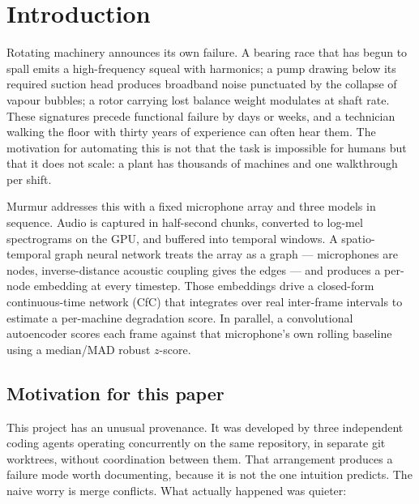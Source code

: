\documentclass[11pt]{article}
\let\oldsection\section
\renewcommand{\section}{\clearpage\oldsection}
\begin{document}
\clearpage
\tableofcontents

\section{Introduction}

Rotating machinery announces its own failure. A bearing race that has begun to
spall emits a high-frequency squeal with harmonics; a pump drawing below its
required suction head produces broadband noise punctuated by the collapse of
vapour bubbles; a rotor carrying lost balance weight modulates at shaft rate.
These signatures precede functional failure by days or weeks, and a technician
walking the floor with thirty years of experience can often hear them. The
motivation for automating this is not that the task is impossible for humans but
that it does not scale: a plant has thousands of machines and one walkthrough per
shift.

Murmur addresses this with a fixed microphone array and three models in
sequence. Audio is captured in half-second chunks, converted to log-mel
spectrograms on the GPU, and buffered into temporal windows. A spatio-temporal
graph neural network treats the array as a graph --- microphones are nodes,
inverse-distance acoustic coupling gives the edges --- and produces a per-node
embedding at every timestep. Those embeddings drive a closed-form continuous-time
network (CfC) that integrates over real inter-frame intervals to estimate a
per-machine degradation score. In parallel, a convolutional autoencoder scores each frame
against that microphone's own rolling baseline using a median/MAD robust
$z$-score.

\subsection{Motivation for this paper}

This project has an unusual provenance. It was developed by three independent
coding agents operating concurrently on the same repository, in separate git
worktrees, without coordination between them. That arrangement produces a
failure mode worth documenting, because it is not the one intuition predicts.
The naive worry is merge conflicts. What actually happened was quieter:
\end{document}
